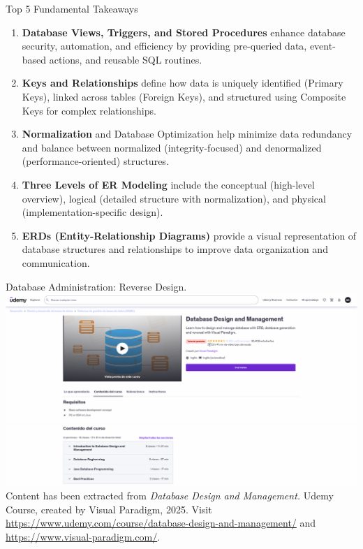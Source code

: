 \documentclass{beamer}
\begin{document}
\begin{frame}{Top 5 Fundamental Takeaways}
    \small
    \begin{enumerate} \pause
        \item[5] \textbf{Database Views, Triggers, and Stored Procedures} enhance database security, automation, and efficiency by providing pre-queried data, event-based actions, and reusable SQL routines. \pause

        \item[4] \textbf{Keys and Relationships} define how data is uniquely identified (Primary Keys), linked across tables (Foreign Keys), and structured using Composite Keys for complex relationships. \pause

        \item[3] \textbf{Normalization} and Database Optimization help minimize data redundancy and balance between normalized (integrity-focused) and denormalized (performance-oriented) structures. \pause

        \item[2] \textbf{Three Levels of ER Modeling} include the conceptual (high-level overview), logical (detailed structure with normalization), and physical (implementation-specific design). \pause

        \item[1] \textbf{ERDs (Entity-Relationship Diagrams)} provide a visual representation of database structures and relationships to improve data organization and communication.
        \end{enumerate}
\end{frame}

\begin{frame}{Database Administration: Reverse Design.}
    \centering
    \includegraphics[width=\textwidth]{figures/udemy2}\\
    \includegraphics[width=\textwidth]{figures/udemy3}\\
    \vspace{2mm}
    {
        \scriptsize
        Content has been extracted from \textit{Database Design and Management.} Udemy Course, created by Visual Paradigm, 2025.  Visit \url{https://www.udemy.com/course/database-design-and-management/} and \url{https://www.visual-paradigm.com/}.\\
    }
\end{frame}
\end{document}
